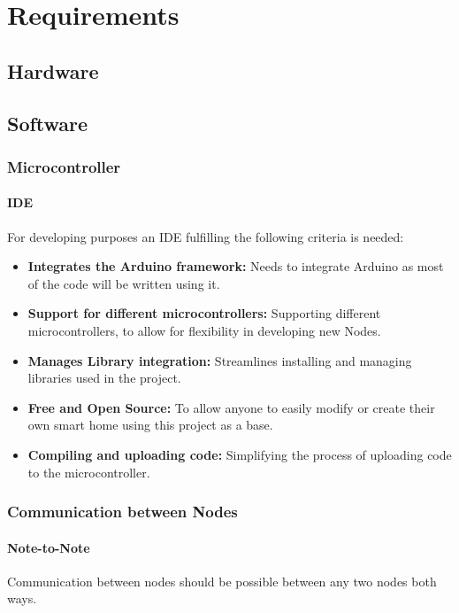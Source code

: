 \chapter{Requirements}
    \section{Hardware}
    \section{Software}
        \subsection{Microcontroller}
            \subsubsection{IDE}
            For developing purposes an IDE fulfilling the following criteria is needed:
            \begin{itemize}
                \item \textbf{Integrates the Arduino framework:}
                Needs to integrate Arduino as most of the code will be written using it.
                \item \textbf{Support for different microcontrollers:}
                Supporting different microcontrollers, to allow for flexibility
                in developing new Nodes.
                \item \textbf{Manages Library integration:}
                Streamlines installing and managing libraries used in the project.
                \item \textbf{Free and Open Source:}
                To allow anyone to easily modify  or create their own smart home
                using this project as a base.
                \item \textbf{Compiling and uploading code:} 
                Simplifying the process of uploading code to the microcontroller.
            \end{itemize} 

        \subsection{Communication between Nodes}
        
            \subsubsection{Note-to-Note}
            Communication between nodes should be possible between any two nodes
            both ways.

